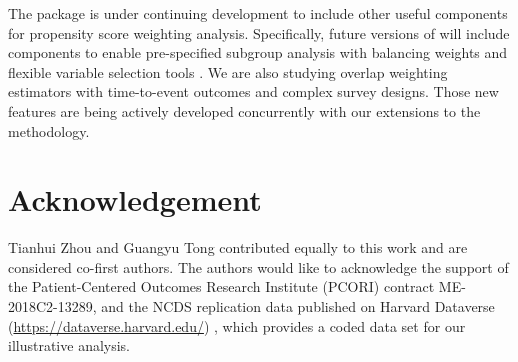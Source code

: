 The  package is under continuing development to include other useful components for propensity score weighting analysis. Specifically, future versions of  will include components to enable pre-specified subgroup analysis with balancing weights and flexible variable selection tools \citep{yang2020propensity}. We are also studying overlap weighting estimators with time-to-event outcomes and complex survey designs. Those new features are being actively developed concurrently with our extensions to the methodology.
 

\section{Acknowledgement}
Tianhui Zhou and Guangyu Tong contributed equally to this work and are considered co-first authors. The authors would like to acknowledge the support of the Patient-Centered Outcomes Research Institute (PCORI) contract ME-2018C2-13289, and the NCDS replication data published on Harvard Dataverse (\url{https://dataverse.harvard.edu/}) \citep{DVNEPCYUL2012}, which provides a coded data set for our illustrative analysis. 

\nocite{R}





\address{Tianhui Zhou\\
  Department of Biostatistics and Bioinformatics\\
  Duke University School of Medicine\\
  2424 Erwin Road, Suite 1105\\
  Durham, NC 27705, United States of America\\
  E-mail: }

\address{Guangyu Tong\\
  Department of Biostatistics\\
  Yale University School of Public Health\\
  300 George St, Suite 511\\
  New Haven, CT 06510, United States of America\\
  E-mail: \\
  $\star$T. Zhou and G. Tong contributed equally to this work and are considered co-first authors.}
  
\address{Fan Li\\
  Department of Statistical Science\\ 
  Duke University\\ 
  122 Old Chemistry Building\\ 
  Durham, NC 27705, United States of America\\
  E-mail: }


